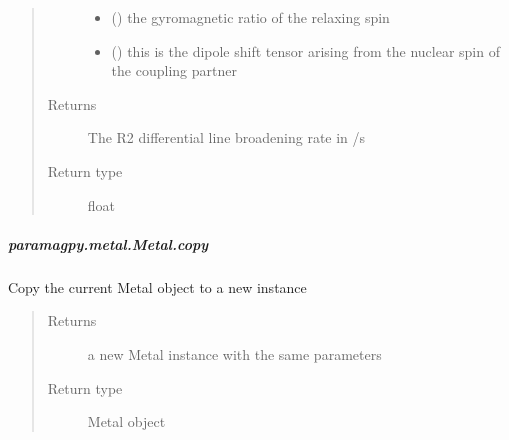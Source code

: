 \documentclass[a4paper,10pt,english,openany,oneside]{sphinxmanual}
\begin{document}
\begin{fulllineitems}
\begin{fulllineitems}
\begin{fulllineitems}
\begin{quote}
\begin{description}
\begin{itemize}
\item {} 
\sphinxAtStartPar
{} () \textendash{} the gyromagnetic ratio of the relaxing spin

\item {} 
\sphinxAtStartPar
{} () \textendash{} this is the dipole shift tensor arising from
the nuclear spin of the coupling partner

\end{itemize}

\item[{Returns}] \leavevmode
\sphinxAtStartPar
{} \textendash{} The R2 differential line broadening rate in /s

\item[{Return type}] \leavevmode
\sphinxAtStartPar
float

\end{description}\end{quote}

\end{fulllineitems}



\subparagraph{paramagpy.metal.Metal.copy}
\label{\detokenize{reference/generated/paramagpy.metal.Metal.copy:paramagpy-metal-metal-copy}}\label{\detokenize{reference/generated/paramagpy.metal.Metal.copy::doc}}

\begin{fulllineitems}
\label{\detokenize{reference/generated/paramagpy.metal.Metal.copy:paramagpy.metal.Metal.copy}}
\sphinxAtStartPar
Copy the current Metal object to a new instance
\begin{quote}\begin{description}
\item[{Returns}] \leavevmode
\sphinxAtStartPar
{} \textendash{} a new Metal instance with the same parameters

\item[{Return type}] \leavevmode
\sphinxAtStartPar
Metal object

\end{description}\end{quote}


\end{fulllineitems}
\end{fulllineitems}
\end{fulllineitems}
\end{document}
